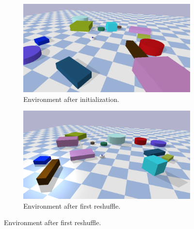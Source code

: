 \begin{figure}[H]
    \centering
    \begin{subfigure}{.49\textwidth}
    \centering
    \includegraphics[width=\textwidth]{figures/results/random1}
    \caption{Environment after initialization.}
    \end{subfigure}
    \hfill
    \begin{subfigure}{.49\textwidth}
    \centering
    \includegraphics[width=\textwidth]{figures/results/random2}
    \caption{Environment after first reshuffle.}
    \end{subfigure}


\end{figure}
